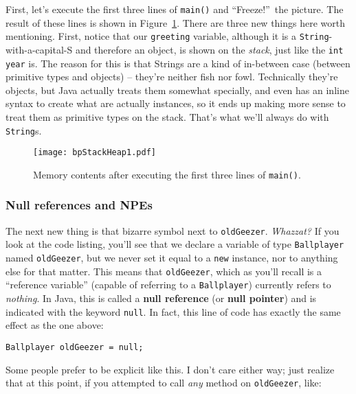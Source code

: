 First, let's execute the first three lines of \texttt{main()} and
``Freeze!''\ the picture. The result of these lines is shown in
Figure~\ref{fig:bpStackHeap1}. There are three new things here worth
mentioning. First, notice that our \texttt{greeting} variable, although it is
a \texttt{String}-with-a-capital-S and therefore an object, is shown on the
\textit{stack}, just like the \texttt{int year} is. The reason for this is
that Strings are a kind of in-between case (between primitive types and
objects) -- they're neither fish nor fowl. Technically they're objects, but
Java actually treats them somewhat specially, and even has an inline syntax to
create what are actually instances, so it ends up making more sense to treat
them as primitive types on the stack. That's what we'll always do with
\texttt{String}s.

\begin{figure}   %
\centering
\texttt{[image: bpStackHeap1.pdf]}
\caption{Memory contents after executing the first three lines of
\texttt{main()}.}
\label{fig:bpStackHeap1}
\end{figure}

\subsubsection{Null references and NPEs}

The next new thing is that bizarre symbol next to \texttt{oldGeezer}.
\textit{Whazzat?} If you look at the code listing, you'll see that we
declare a variable of type \texttt{Ballplayer} named \texttt{oldGeezer}, but
we never set it equal to a \texttt{new} instance, nor to anything else for
that matter. This means that \texttt{oldGeezer}, which as you'll recall is a
``reference variable'' (capable of referring to a \texttt{Ballplayer})
currently refers to \textit{nothing}. In Java, this is called a \textbf{null
reference} (or \textbf{null pointer}) and is indicated with the keyword
\texttt{null}. In fact, this line of code has exactly the same effect as the
one above:

\begin{Verbatim}[fontsize=\small,samepage=true]
    Ballplayer oldGeezer = null;
\end{Verbatim}

Some people prefer to be explicit like this. I don't care either way; just
realize that at this point, if you attempted to call \textit{any} method on
\texttt{oldGeezer}, like:


